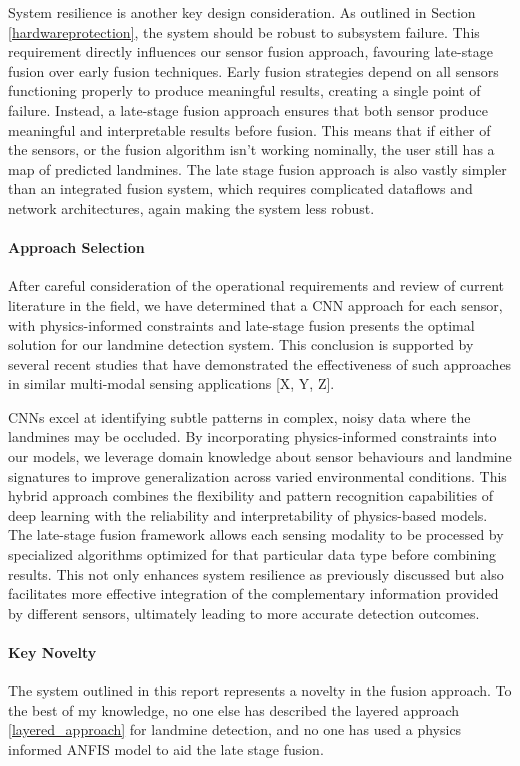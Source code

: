         System resilience is another key design consideration. As outlined in Section \ref{hardwareprotection}, the system should be robust to subsystem failure. This requirement directly influences our sensor fusion approach, favouring late-stage fusion over early fusion techniques. Early fusion strategies depend on all sensors functioning properly to produce meaningful results, creating a single point of failure. Instead, a late-stage fusion approach ensures that both sensor produce meaningful and interpretable results before fusion. This means that if either of the sensors, or the fusion algorithm isn't working nominally, the user still has a map of predicted landmines. The late stage fusion approach is also vastly simpler than an integrated fusion system, which requires complicated dataflows and network architectures, again making the system less robust.
        
        \cite{barnawi2022review}

    \paragraph{Approach Selection}
    
        After careful consideration of the operational requirements and review of current literature in the field, we have determined that a CNN approach for each sensor, with physics-informed constraints and late-stage fusion presents the optimal solution for our landmine detection system. This conclusion is supported by several recent studies that have demonstrated the effectiveness of such approaches in similar multi-modal sensing applications [X, Y, Z].
        
        CNNs excel at identifying subtle patterns in complex, noisy data where the landmines may be occluded. By incorporating physics-informed constraints into our models, we leverage domain knowledge about sensor behaviours and landmine signatures to improve generalization across varied environmental conditions. This hybrid approach combines the flexibility and pattern recognition capabilities of deep learning with the reliability and interpretability of physics-based models.
        The late-stage fusion framework allows each sensing modality to be processed by specialized algorithms optimized for that particular data type before combining results. This not only enhances system resilience as previously discussed but also facilitates more effective integration of the complementary information provided by different sensors, ultimately leading to more accurate detection outcomes.
    
    \paragraph{Key Novelty}
    
        The system outlined in this report represents a novelty in the fusion approach. To the best of my knowledge, no one else has described the layered approach \ref{layered_approach} for landmine detection, and no one has used a physics informed ANFIS model to aid the late stage fusion.


